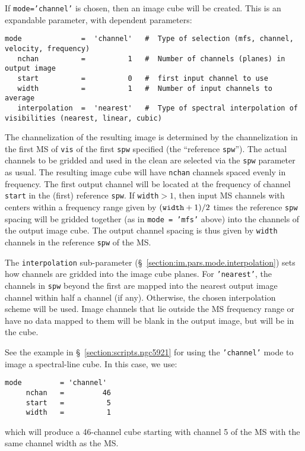 If {\tt mode='channel'} is chosen, then an image cube will be
created. This is an expandable parameter, with dependent parameters:
\small
\begin{verbatim}
mode              =  'channel'   #  Type of selection (mfs, channel, velocity, frequency)
   nchan          =          1   #  Number of channels (planes) in output image
   start          =          0   #  first input channel to use
   width          =          1   #  Number of input channels to average
   interpolation  =  'nearest'   #  Type of spectral interpolation of visibilities (nearest, linear, cubic)
\end{verbatim}
\normalsize
The channelization of the resulting image is determined by the 
channelization in the first MS of {\tt vis} of the first {\tt spw} 
specified (the ``reference {\tt spw}''). The actual channels to
be gridded and used in the clean are selected via the {\tt spw} 
parameter as usual. 
The resulting image cube will have {\tt nchan} channels spaced
evenly in frequency.  The
first output channel will be located at the frequency of channel 
{\tt start} in the (first) reference {\tt spw}.  If {\tt width}$ > 1$,
then input MS channels with centers within a frequency range given by 
$({\tt width}+1)/2$ times the reference {\tt spw} spacing
will be gridded together (as in {\tt mode = 'mfs'} above)
into the channels of the output image cube.  
The output channel 
spacing is thus given by {\tt width} channels in the reference {\tt spw}
of the MS.  
  
The {\tt interpolation} sub-parameter
(\S~\ref{section:im.pars.mode.interpolation}) sets how channels are
gridded into the image cube planes.  For {\tt 'nearest'}, the
channels in {\tt spw} beyond the first are mapped
into the nearest output image channel within half a channel (if
any).  Otherwise, the chosen interpolation scheme will be used.
Image channels that lie outside the MS frequency range or
have no data mapped to them will be blank in the output image,
but will be in the cube.  

See the example in \S~\ref{section:scripts.ngc5921} for using the {\tt 'channel'}
mode to image a spectral-line cube. In this case, we use:
\small
\begin{verbatim}
mode         = 'channel'       
     nchan   =         46   
     start   =          5   
     width   =          1   
\end{verbatim}
\normalsize
which will produce a 46-channel cube starting with channel 5 of the MS
with the same channel width as the MS.

